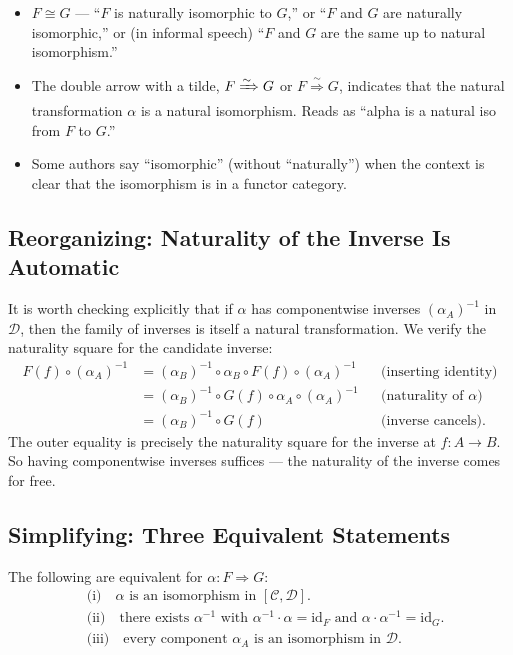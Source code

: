 \begin{howtosay}
\begin{itemize}
  \item $F \cong G$ — ``$F$ is naturally isomorphic to $G$,'' or ``$F$ and
        $G$ are naturally isomorphic,'' or (in informal speech) ``$F$ and
        $G$ are the same up to natural isomorphism.''
  \item The double arrow with a tilde, $F \xRightarrow{\sim} G$ or
        $F \overset{\sim}{\Rightarrow} G$, indicates that the natural
        transformation $\alpha$ is a natural isomorphism. Reads as
        ``alpha is a natural iso from $F$ to $G$.''
  \item Some authors say ``isomorphic'' (without ``naturally'') when the
        context is clear that the isomorphism is in a functor category.
\end{itemize}
\end{howtosay}

\subsection{Reorganizing: Naturality of the Inverse Is Automatic}

It is worth checking explicitly that if $\alpha$ has componentwise inverses
$(\alpha_A)^{-1}$ in $\mathcal{D}$, then the family of inverses is itself a
natural transformation. We verify the naturality square for the candidate
inverse:
\begin{align*}
  F(f) \circ (\alpha_A)^{-1}
    &= (\alpha_B)^{-1} \circ \alpha_B \circ F(f) \circ (\alpha_A)^{-1}
       && \text{(inserting identity)} \\
    &= (\alpha_B)^{-1} \circ G(f) \circ \alpha_A \circ (\alpha_A)^{-1}
       && \text{(naturality of $\alpha$)} \\
    &= (\alpha_B)^{-1} \circ G(f)
       && \text{(inverse cancels)}.
\end{align*}
The outer equality is precisely the naturality square for the inverse at
$f : A \to B$. So having componentwise inverses suffices --- the naturality
of the inverse comes for free.

\subsection{Simplifying: Three Equivalent Statements}

The following are equivalent for $\alpha : F \Rightarrow G$:
\begin{align*}
  &\text{(i)} \quad \alpha \text{ is an isomorphism in } [\mathcal{C}, \mathcal{D}]. \\
  &\text{(ii)} \quad \text{there exists } \alpha^{-1} \text{ with }
    \alpha^{-1} \cdot \alpha = \mathrm{id}_F \text{ and }
    \alpha \cdot \alpha^{-1} = \mathrm{id}_G. \\
  &\text{(iii)} \quad \text{every component } \alpha_A \text{ is an isomorphism in } \mathcal{D}.
\end{align*}

